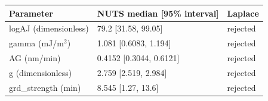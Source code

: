 \begin{tabular}{lll}
Parameter & NUTS median [95\% interval] & Laplace \\
\hline
logAJ (dimensionless) & 79.2 [31.58, 99.05] & rejected \\
gamma (mJ/m$^2$) & 1.081 [0.6083, 1.194] & rejected \\
AG (nm/min) & 0.4152 [0.3044, 0.6121] & rejected \\
g (dimensionless) & 2.759 [2.519, 2.984] & rejected \\
grd\_strength (min) & 8.545 [1.27, 13.6] & rejected \\
\end{tabular}
